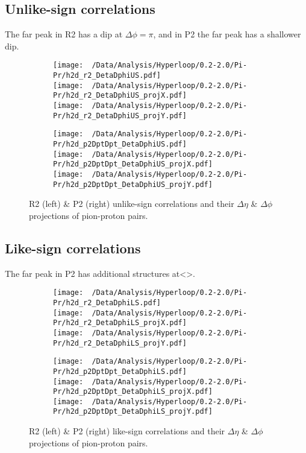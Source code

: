 \documentclass[12pt,a4paper,twoside]{report}
\begin{document}
\subsection{Unlike-sign correlations}
The far peak in R2 has a dip at $\Delta\phi=\pi$, and in P2 the far peak has a shallower dip.
\begin{figure}[H]
	\begin{subfigure}{0.49\linewidth}
		\texttt{[image: ~/Data/Analysis/Hyperloop/0.2-2.0/Pi-Pr/h2d\_r2\_DetaDphiUS.pdf]}\\
		\texttt{[image: ~/Data/Analysis/Hyperloop/0.2-2.0/Pi-Pr/h2d\_r2\_DetaDphiUS\_projX.pdf]}\\
		\texttt{[image: ~/Data/Analysis/Hyperloop/0.2-2.0/Pi-Pr/h2d\_r2\_DetaDphiUS\_projY.pdf]}\\
	\end{subfigure}
	\begin{subfigure}{0.49\linewidth}
		\texttt{[image: ~/Data/Analysis/Hyperloop/0.2-2.0/Pi-Pr/h2d\_p2DptDpt\_DetaDphiUS.pdf]}\\
		\texttt{[image: ~/Data/Analysis/Hyperloop/0.2-2.0/Pi-Pr/h2d\_p2DptDpt\_DetaDphiUS\_projX.pdf]}\\
		\texttt{[image: ~/Data/Analysis/Hyperloop/0.2-2.0/Pi-Pr/h2d\_p2DptDpt\_DetaDphiUS\_projY.pdf]}\\
	\end{subfigure}
	\caption{R2 (left) \& P2 (right) unlike-sign correlations and their $\Delta\eta$ \& $\Delta\phi$ projections of pion-proton pairs.}
\end{figure}
\subsection{Like-sign correlations}
The far peak in P2 has additional structures at<>.
\begin{figure}[H]
	\begin{subfigure}{0.49\linewidth}
		\texttt{[image: ~/Data/Analysis/Hyperloop/0.2-2.0/Pi-Pr/h2d\_r2\_DetaDphiLS.pdf]}\\
		\texttt{[image: ~/Data/Analysis/Hyperloop/0.2-2.0/Pi-Pr/h2d\_r2\_DetaDphiLS\_projX.pdf]}\\
		\texttt{[image: ~/Data/Analysis/Hyperloop/0.2-2.0/Pi-Pr/h2d\_r2\_DetaDphiLS\_projY.pdf]}\\
	\end{subfigure}
	\begin{subfigure}{0.49\linewidth}
		\texttt{[image: ~/Data/Analysis/Hyperloop/0.2-2.0/Pi-Pr/h2d\_p2DptDpt\_DetaDphiLS.pdf]}\\
		\texttt{[image: ~/Data/Analysis/Hyperloop/0.2-2.0/Pi-Pr/h2d\_p2DptDpt\_DetaDphiLS\_projX.pdf]}\\
		\texttt{[image: ~/Data/Analysis/Hyperloop/0.2-2.0/Pi-Pr/h2d\_p2DptDpt\_DetaDphiLS\_projY.pdf]}\\
	\end{subfigure}
	\caption{R2 (left) \& P2 (right) like-sign correlations and their $\Delta\eta$ \& $\Delta\phi$ projections of pion-proton pairs.}
\end{figure}
\end{document}
